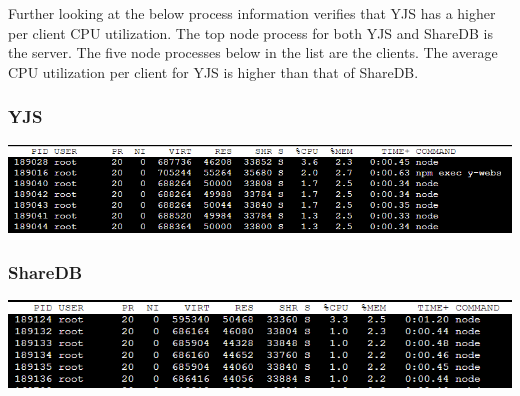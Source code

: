 \documentclass[12pt]{article}
\begin{document}
  Further looking at the below process information verifies that YJS has a higher per client CPU utilization. The top node process for both YJS and ShareDB is the server. The five node processes below in the list are the clients.
  The average CPU utilization per client for YJS is higher than that of ShareDB.
  
  \subsubsection{YJS}
  \begin{center}
    \includegraphics[scale=0.60]{yjs_processes.png}
  \end{center}

  \subsubsection{ShareDB}
  \begin{center}
    \includegraphics[scale=0.60]{sharedb_processes.PNG}
  \end{center}
\end{document}
